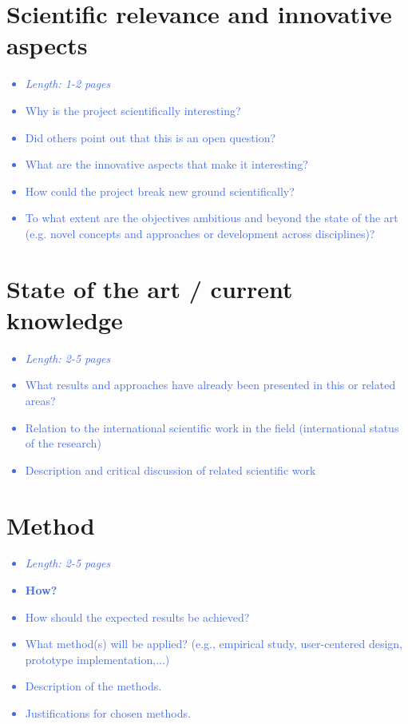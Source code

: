 \documentclass[a4paper,11pt]{article}
\providecommand*{\note}[1]{\small \textcolor{RoyalBlue}{\begin{minipage}{\textwidth}{#1}\end{minipage}}}
\begin{document}
\section{Scientific relevance and innovative aspects}
\label{sect:relevance}

\note{
\begin{itemize}
\item {\em Length: 1-2 pages}
\item Why is the project scientifically interesting?
\item Did others point out that this is an open question?
\item What are the innovative aspects that make it interesting?
\item How could the project break new ground scientifically?
\item To what extent are the objectives ambitious and beyond the state of the art (e.g. novel concepts and approaches or development across disciplines)?
\end{itemize}
}

\section{State of the art / current knowledge}
\label{sect:star}

\note{
\begin{itemize}
\item {\em Length: 2-5 pages}
\item What results and approaches have already been presented in this or related areas?
\item Relation to the international scientific work in the field (international status of the research)
\item Description and critical discussion of related scientific work
\end{itemize}
}

\section{Method}
\label{sect:method}

\note{
\begin{itemize}
\item {\em Length: 2-5 pages}
\item {\bf How?}
\item How should the expected results be achieved?
\item What method(s) will be applied? (e.g., empirical study, user-centered design, prototype implementation,...)
\item Description of the methods.
\item Justifications for chosen methods.
\end{itemize}
}
\end{document}
